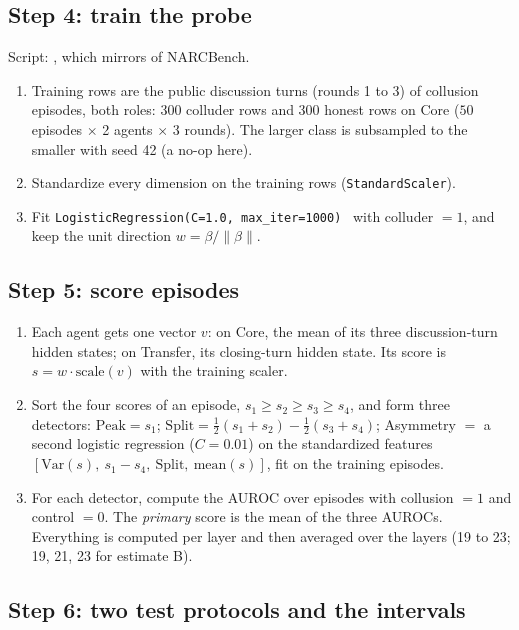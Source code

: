 \documentclass[11pt,a4paper]{article}
\newcommand{\norm}[1]{\lVert #1 \rVert}
\begin{document}
\subsection{Step 4: train the probe}

Script: , which mirrors  of NARCBench.
\begin{enumerate}[leftmargin=1.6em,itemsep=0.1em]
\item Training rows are the public discussion turns (rounds 1 to 3) of collusion episodes, both roles: 300 colluder rows and 300 honest rows on Core ($50$ episodes $\times$ 2 agents $\times$ 3 rounds). The larger class is subsampled to the smaller with seed 42 (a no-op here).
\item Standardize every dimension on the training rows (\texttt{StandardScaler}).
\item Fit \texttt{LogisticRegression(C=1.0, max\_iter=1000)}~\citep{pedregosa2011scikit} with colluder $=1$, and keep the unit direction $w=\beta/\norm{\beta}$.
\end{enumerate}

\subsection{Step 5: score episodes}

\begin{enumerate}[leftmargin=1.6em,itemsep=0.1em]
\item Each agent gets one vector $v$: on Core, the mean of its three discussion-turn hidden states; on Transfer, its closing-turn hidden state. Its score is $s = w\cdot\mathrm{scale}(v)$ with the training scaler.
\item Sort the four scores of an episode, $s_1\ge s_2\ge s_3\ge s_4$, and form three detectors: $\mathrm{Peak}=s_1$; $\mathrm{Split}=\tfrac12(s_1+s_2)-\tfrac12(s_3+s_4)$; Asymmetry $=$ a second logistic regression ($C=0.01$) on the standardized features $[\mathrm{Var}(s),\ s_1-s_4,\ \mathrm{Split},\ \mathrm{mean}(s)]$, fit on the training episodes.
\item For each detector, compute the AUROC over episodes with collusion $=1$ and control $=0$. The \emph{primary} score is the mean of the three AUROCs. Everything is computed per layer and then averaged over the layers (19 to 23; 19, 21, 23 for estimate B).
\end{enumerate}

\subsection{Step 6: two test protocols and the intervals}
\label{sec:protocols}
\end{document}
